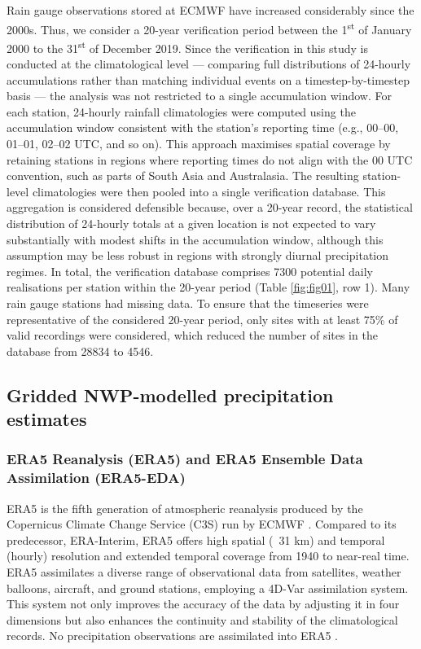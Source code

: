 \documentclass{ametsocV6.1}
\begin{document}
Rain gauge observations stored at ECMWF have increased considerably since the 2000s. Thus, we consider a 20-year verification period between the 1\textsuperscript{st} of January 2000 to the 31\textsuperscript{st} of December 2019. Since the verification in this study is conducted at the climatological level — comparing full distributions of 24-hourly accumulations rather than matching individual events on a timestep-by-timestep basis — the analysis was not restricted to a single accumulation window. For each station, 24-hourly rainfall climatologies were computed using the accumulation window consistent with the station's reporting time (e.g., 00–00, 01–01, 02–02 UTC, and so on). This approach maximises spatial coverage by retaining stations in regions where reporting times do not align with the 00 UTC convention, such as parts of South Asia and Australasia. The resulting station-level climatologies were then pooled into a single verification database. This aggregation is considered defensible because, over a 20-year record, the statistical distribution of 24-hourly totals at a given location is not expected to vary substantially with modest shifts in the accumulation window, although this assumption may be less robust in regions with strongly diurnal precipitation regimes. In total, the verification database comprises 7300 potential daily realisations per station within the 20-year period (Table \ref{fig:fig01}, row 1). Many rain gauge stations had missing data. To ensure that the timeseries were representative of the considered 20-year period, only sites with at least 75\% of valid recordings were considered, which reduced the number of sites in the database from 28834 to 4546. 

\subsection{Gridded NWP-modelled precipitation estimates}

\subsubsection{ERA5 Reanalysis (ERA5) and ERA5 Ensemble Data Assimilation (ERA5-EDA)}
ERA5 is the fifth generation of atmospheric reanalysis produced by the Copernicus Climate Change Service (C3S) run by ECMWF \citep{Hersbach2020}. Compared to its predecessor, ERA-Interim, ERA5 offers high spatial (~31 km) and temporal (hourly) resolution and extended temporal coverage from 1940 to near-real time. ERA5 assimilates a diverse range of observational data from satellites, weather balloons, aircraft, and ground stations, employing a 4D-Var assimilation system. This system not only improves the accuracy of the data by adjusting it in four dimensions but also enhances the continuity and stability of the climatological records. No precipitation observations are assimilated into ERA5 \citep{Hersbach2020}. 
\end{document}

